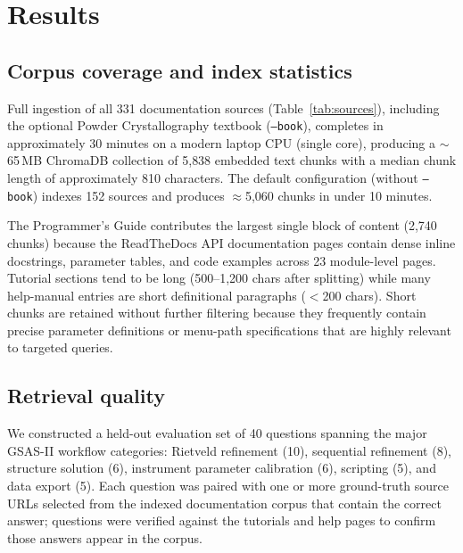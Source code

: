 \section{Results}
\label{sec:results}

\subsection{Corpus coverage and index statistics}

Full ingestion of all 331 documentation sources (Table~\ref{tab:sources}),
including the optional Powder Crystallography textbook (\texttt{--book}),
completes in approximately 30 minutes on a modern laptop CPU (single core),
producing a $\sim$65\,MB ChromaDB collection of 5{,}838 embedded
text chunks with a median chunk length of approximately 810 characters.
The default configuration (without \texttt{--book}) indexes 152 sources
and produces $\approx$5{,}060 chunks in under 10 minutes.

The Programmer's Guide contributes the largest single block of content
(2{,}740 chunks) because the ReadTheDocs API documentation pages contain
dense inline docstrings, parameter tables, and code examples across
23 module-level pages.
Tutorial sections tend to be long (500--1{,}200 chars after splitting)
while many help-manual entries are short definitional paragraphs
($<$200 chars).
Short chunks are retained without further filtering because they
frequently contain precise parameter definitions or menu-path
specifications that are highly relevant to targeted queries.

\subsection{Retrieval quality}
\label{sec:retrieval-eval}

We constructed a held-out evaluation set of 40 questions spanning the
major GSAS-II workflow categories: Rietveld refinement (10),
sequential refinement (8), structure solution (6), instrument
parameter calibration (6), scripting (5), and data export (5).
Each question was paired with one or more ground-truth source
URLs selected from the indexed documentation corpus that contain
the correct answer; questions were verified against the tutorials
and help pages to confirm those answers appear in the corpus.

